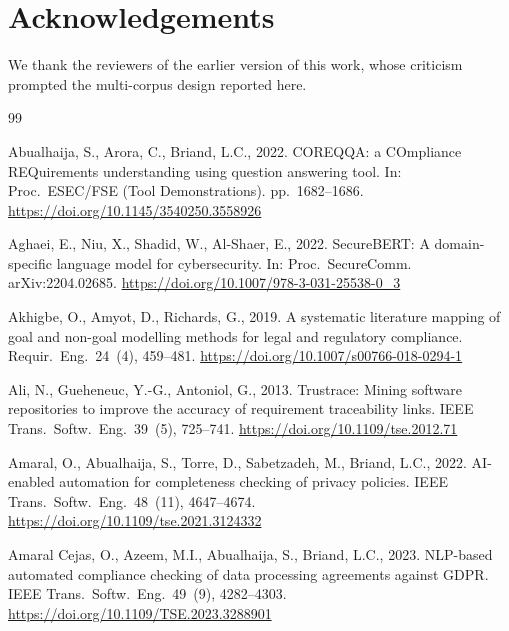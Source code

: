 \documentclass[a4paper,fleqn]{cas-sc}
\begin{document}
\section*{Acknowledgements}
We thank the reviewers of the earlier version of this work, whose criticism
prompted the multi-corpus design reported here.





\begin{thebibliography}{99}

Abualhaija, S., Arora, C., Briand, L.C., 2022. COREQQA: a COmpliance REQuirements understanding using question answering tool. In: Proc.\ ESEC/FSE (Tool Demonstrations). pp.\ 1682--1686. \url{https://doi.org/10.1145/3540250.3558926}

Aghaei, E., Niu, X., Shadid, W., Al-Shaer, E., 2022. SecureBERT: A domain-specific language model for cybersecurity. In: Proc.\ SecureComm. arXiv:2204.02685. \url{https://doi.org/10.1007/978-3-031-25538-0_3}

Akhigbe, O., Amyot, D., Richards, G., 2019. A systematic literature mapping of goal and non-goal modelling methods for legal and regulatory compliance. Requir.\ Eng.\ 24~(4), 459--481. \url{https://doi.org/10.1007/s00766-018-0294-1}

Ali, N., Gueheneuc, Y.-G., Antoniol, G., 2013. Trustrace: Mining software repositories to improve the accuracy of requirement traceability links. IEEE Trans.\ Softw.\ Eng.\ 39~(5), 725--741. \url{https://doi.org/10.1109/tse.2012.71}

Amaral, O., Abualhaija, S., Torre, D., Sabetzadeh, M., Briand, L.C., 2022. AI-enabled automation for completeness checking of privacy policies. IEEE Trans.\ Softw.\ Eng.\ 48~(11), 4647--4674. \url{https://doi.org/10.1109/tse.2021.3124332}

Amaral Cejas, O., Azeem, M.I., Abualhaija, S., Briand, L.C., 2023. NLP-based automated compliance checking of data processing agreements against GDPR. IEEE Trans.\ Softw.\ Eng.\ 49~(9), 4282--4303. \url{https://doi.org/10.1109/TSE.2023.3288901}


\end{thebibliography}
\end{document}
